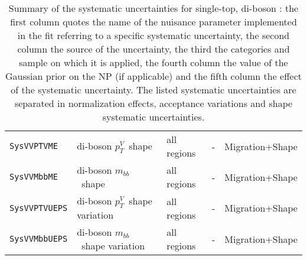 \begin{table}
{\begin{tabular}{lllll}
      \texttt{SysVVPTVME} & di-boson $p_T^V$\ shape & all regions & - & Migration+Shape \\ 
      \texttt{SysVVMbbME} & di-boson $m_{bb}$\ shape & all regions & - & Migration+Shape \\ 
      \texttt{SysVVPTVUEPS} & di-boson $p_T^V$\ shape variation & all regions & - & Migration+Shape \\
      \texttt{SysVVMbbUEPS} & di-boson $m_{bb}$\ shape variation & all regions & - & Migration+Shape\\
\bottomrule
\end{tabular}
}
\caption[Summary of specific nuisance parameters.]{Summary of the systematic
  uncertainties for single-top, di-boson : the first column quotes the name of
  the nuisance parameter implemented in the fit referring to a specific
  systematic uncertainty, the second column the source of the uncertainty, the
  third the categories and sample on which it is applied, the fourth column the
  value of  the Gaussian prior on the NP (if applicable) and the fifth column
  the effect of the systematic uncertainty. The listed systematic uncertainties
  are separated in normalization effects, acceptance variations  and shape
  systematic uncertainties.}
\label{tab:small_bkg_systematics}
\end{table}